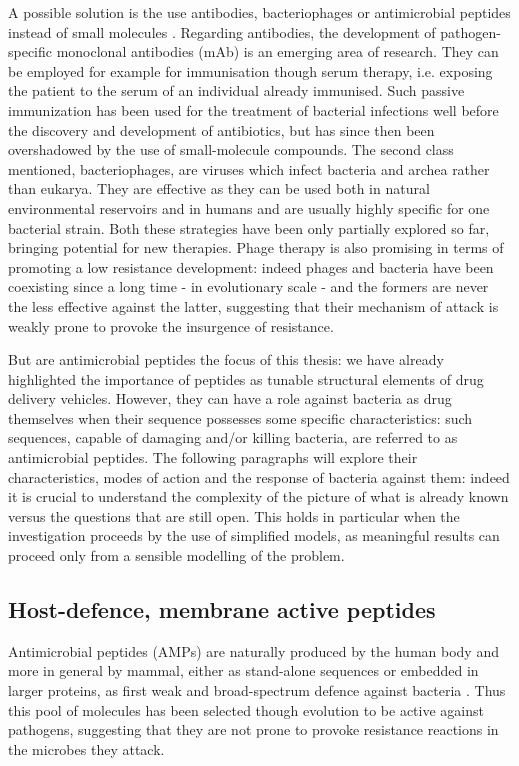 A possible solution is the use antibodies, bacteriophages or antimicrobial peptides instead of small molecules \cite{Mantravadi2019}.
%
Regarding antibodies, the development of pathogen-specific monoclonal antibodies (mAb) is an emerging area of research. They can be employed for example for immunisation though serum therapy, i.e. exposing the patient to the serum of an individual already immunised. Such passive immunization has been used for the treatment of bacterial infections well before the discovery and development of antibiotics, but has since then been overshadowed by the use of small-molecule compounds.
%
The second class mentioned, bacteriophages, are viruses which infect bacteria and archea rather than eukarya. They are effective as they can be used both in natural environmental reservoirs and in humans and are usually highly specific for one bacterial strain.
%
Both these strategies have been only partially explored so far, bringing potential for new therapies. Phage therapy is also promising in terms of promoting a low resistance development: indeed phages and bacteria have been coexisting since a long time - in evolutionary scale - and the formers are never the less effective against the latter, suggesting that their mechanism of attack is weakly prone to provoke the insurgence of resistance.

But are antimicrobial peptides the focus of this thesis: we have already highlighted the importance of peptides as tunable structural elements of drug delivery vehicles. However, they can have a role against bacteria as drug themselves when their sequence possesses some specific characteristics: such sequences, capable of damaging and/or killing bacteria, are referred to as antimicrobial peptides. The following paragraphs will explore their characteristics, modes of action and the response of bacteria against them: indeed it is crucial to understand the complexity of the picture of what is already known versus the questions that are still open. This holds in particular when the investigation proceeds by the use of simplified models, as meaningful results can proceed only from a sensible  modelling of the problem.


\subsection{Host-defence, membrane active peptides}
Antimicrobial peptides (AMPs) are naturally produced by the human body and more in general by mammal, either as stand-alone sequences or embedded in larger proteins, as first weak and broad-spectrum defence against bacteria \cite{Nguyen2011,Bahar2013,Mahlapuu2016,Zhang2016}.
%
Thus this pool of molecules has been selected though evolution to be active against pathogens, suggesting that they are not prone to provoke resistance reactions in the microbes they attack.

